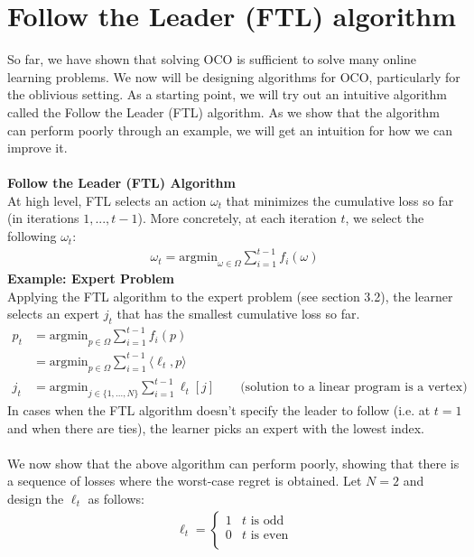 \documentclass[11pt]{article}
\newcommand{\1}{\mathbb{I}} %
\begin{document}
\section{Follow the Leader (FTL) algorithm}
So far, we have shown that solving OCO is sufficient to solve many online learning problems. We now will be designing algorithms for OCO, particularly for the oblivious setting. As a starting point, we will try out an intuitive algorithm called the Follow the Leader (FTL) algorithm. As we show that the algorithm can perform poorly through an example, we will get an intuition for how we can improve it. \\\\
\textbf{Follow the Leader (FTL) Algorithm} \\
At high level, FTL selects an action $\omega_t$ that minimizes the cumulative loss so far (in iterations $1, ..., t-1$). More concretely, at each iteration $t$, we select the following $\omega_t$:
\begin{align*}
\omega_t = \text{argmin}_{\omega \in \Omega}\sum_{i=1}^{t-1}{f_{i}(\omega)}
\end{align*}
\textbf{Example: Expert Problem}\\
Applying the FTL algorithm to the expert problem (see section 3.2), the learner selects an expert $j_t$ that has the smallest cumulative loss so far.
\begin{align*}
p_t &= \text{argmin}_{p \in \Omega}\sum_{i=1}^{t-1}{f_{i}(p)}\\
&= \text{argmin}_{p \in \Omega}\sum_{i=1}^{t-1}{\langle \ell_t, p\rangle}\\
j_t &= \text{argmin}_{j \in \{1,...,N\}}\sum_{i=1}^{t-1}{\ell_t[j]} \qquad \text{(solution to a linear program is a vertex)}
\end{align*}
In cases when the FTL algorithm doesn't specify the leader to follow (i.e. at $t=1$ and when there are ties), the learner picks an expert with the lowest index. \\\\
We now show that the above algorithm can perform poorly, showing that there is a sequence of losses where the worst-case regret is obtained. Let $N=2$ and design the $\ell_t$ as follows:
\begin{align*}
\ell_t = \begin{cases} 
 	     1 & t \text{ is odd} \\
 	     0 & t \text{ is even} \\
 	  \end{cases}
\end{align*}
\end{document}

